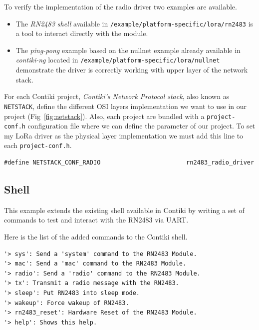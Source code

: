 
To verify the implementation of the radio driver two examples are available.

\begin{itemize}
  \item The \emph{RN2483 shell} available in
    \lstinline{/example/platform-specific/lora/rn2483} is a tool to interact
    directly with the module.
  \item The \emph{ping-pong} example based on the nullnet example already
    available in \emph{contiki-ng} located in 
    \lstinline{/example/platform-specific/lora/nullnet} demonstrate the driver
    is correctly working with upper layer of the network stack.
\end{itemize}

For each Contiki project, \emph{Contiki's Network Protocol stack}, also known
as \lstinline{NETSTACK}, define the different OSI layers implementation we 
want to use in our project (Fig~\ref{fig:netstack}).
Also, each project are bundled with a \lstinline{project-conf.h}
configuration file where we can define the parameter of our project. 
To set my LoRa driver as the physical layer implementation we must add this line to
each \lstinline{project-conf.h}.

\begin{lstlisting}
#define NETSTACK_CONF_RADIO                        rn2483_radio_driver
\end{lstlisting}



\subsection{Shell}

This example extends the existing shell available in Contiki by writing a set
of commands to test and interact with the RN2483 via UART\@.

Here is the list of the added commands to the Contiki shell.

\begin{lstlisting}
'> sys': Send a 'system' command to the RN2483 Module.
'> mac': Send a 'mac' command to the RN2483 Module.
'> radio': Send a 'radio' command to the RN2483 Module.
'> tx': Transmit a radio message with the RN2483.
'> sleep': Put RN2483 into sleep mode.
'> wakeup': Force wakeup of RN2483.
'> rn2483_reset': Hardware Reset of the RN2483 Module.
'> help': Shows this help.
\end{lstlisting}

